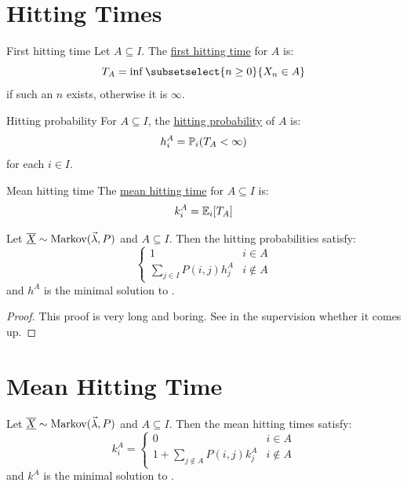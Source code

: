 \documentclass[../Main.tex]{subfiles}
\begin{document}
\section{Hitting Times}
\begin{definition}{First hitting time}
    Let $A \subseteq I$. The \underline{first hitting time} for $A$ is:
    \begin{equation*}
        T_A = \inf \subsetselect{n \geq 0}{X_n \in A}
    \end{equation*}
    if such an $n$ exists, otherwise it is $\infty$.
\end{definition}
\begin{definition}{Hitting probability}
    For $A \subseteq I$, the \underline{hitting probability} of $A$ is:
    \begin{equation*}
        h_i^A = \P_i (T_A < \infty)
    \end{equation*}
    for each $i \in I$.
\end{definition}
\begin{definition}{Mean hitting time}
    The \underline{mean hitting time} for $A \subseteq I$ is:
    \begin{equation*}
        k_i^A = \E_i[T_A]
    \end{equation*}
\end{definition}
\begin{theorem}
    Let $\chain{X} \sim \Mkv{\vec{\lambda}}{P}$ and $A \subseteq I$. Then the hitting probabilities satisfy:
    \begin{equation}
        \begin{cases}
            1 & i \in A \\
            \sum_{j \in I} P(i, j) h_j^A & i \notin A
        \end{cases}
        \label{eqnHittingProbEquations}
    \end{equation}
    and $h^A$ is the minimal solution to .
    \label{thmHitingProbEquations}
\end{theorem}
\begin{proof}
    This proof is very long and boring. See in the supervision whether it comes up.
\end{proof}
\section{Mean Hitting Time}
\begin{theorem}
    Let $\chain{X} \sim \Mkv{\vec{\lambda}}{P}$ and $A \subseteq I$. Then the mean hitting times satisfy:
    \begin{equation}
        k_i^A =
        \begin{cases}
            0 & i \in A \\
            1 + \sum_{j \notin A} P(i, j) k_j^A & i \notin A
        \end{cases}
        \label{eqnMeanHittingTimeEquations}
    \end{equation}
    and $k^A$ is the minimal solution to .
    \label{thmMeanHittingTimeEquations}
\end{theorem}
\end{document}
